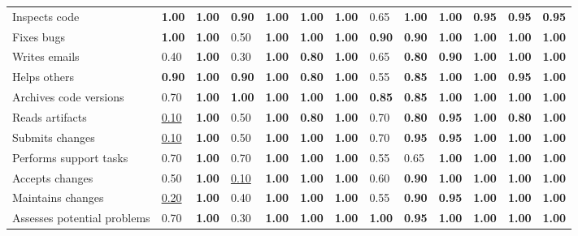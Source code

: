 \begin{tabular}{lllllllllllll}
Inspects code & \textbf{1.00} & \textbf{1.00} & \textbf{0.90} & \textbf{1.00} & \textbf{1.00} & \textbf{1.00} & 0.65 & \textbf{1.00} & \textbf{1.00} & \textbf{0.95} & \textbf{0.95} & \textbf{0.95} \\
Fixes bugs & \textbf{1.00} & \textbf{1.00} & 0.50 & \textbf{1.00} & \textbf{1.00} & \textbf{1.00} & \textbf{0.90} & \textbf{0.90} & \textbf{1.00} & \textbf{1.00} & \textbf{1.00} & \textbf{1.00} \\
Writes emails & 0.40 & \textbf{1.00} & 0.30 & \textbf{1.00} & \textbf{0.80} & \textbf{1.00} & 0.65 & \textbf{0.80} & \textbf{0.90} & \textbf{1.00} & \textbf{1.00} & \textbf{1.00} \\
Helps others & \textbf{0.90} & \textbf{1.00} & \textbf{0.90} & \textbf{1.00} & \textbf{0.80} & \textbf{1.00} & 0.55 & \textbf{0.85} & \textbf{1.00} & \textbf{1.00} & \textbf{0.95} & \textbf{1.00} \\
Archives code versions & 0.70 & \textbf{1.00} & \textbf{1.00} & \textbf{1.00} & \textbf{1.00} & \textbf{1.00} & \textbf{0.85} & \textbf{0.85} & \textbf{1.00} & \textbf{1.00} & \textbf{1.00} & \textbf{1.00} \\
Reads artifacts & \underline{0.10} & \textbf{1.00} & 0.50 & \textbf{1.00} & \textbf{0.80} & \textbf{1.00} & 0.70 & \textbf{0.80} & \textbf{0.95} & \textbf{1.00} & \textbf{0.80} & \textbf{1.00} \\
Submits changes & \underline{0.10} & \textbf{1.00} & 0.50 & \textbf{1.00} & \textbf{1.00} & \textbf{1.00} & 0.70 & \textbf{0.95} & \textbf{0.95} & \textbf{1.00} & \textbf{1.00} & \textbf{1.00} \\
Performs support tasks & 0.70 & \textbf{1.00} & 0.70 & \textbf{1.00} & \textbf{1.00} & \textbf{1.00} & 0.55 & 0.65 & \textbf{1.00} & \textbf{1.00} & \textbf{1.00} & \textbf{1.00} \\
Accepts changes & 0.50 & \textbf{1.00} & \underline{0.10} & \textbf{1.00} & \textbf{1.00} & \textbf{1.00} & 0.60 & \textbf{0.90} & \textbf{1.00} & \textbf{1.00} & \textbf{1.00} & \textbf{1.00} \\
Maintains changes & \underline{0.20} & \textbf{1.00} & 0.40 & \textbf{1.00} & \textbf{1.00} & \textbf{1.00} & 0.55 & \textbf{0.90} & \textbf{0.95} & \textbf{1.00} & \textbf{1.00} & \textbf{1.00} \\
Assesses potential problems & 0.70 & \textbf{1.00} & 0.30 & \textbf{1.00} & \textbf{1.00} & \textbf{1.00} & \textbf{1.00} & \textbf{0.95} & \textbf{1.00} & \textbf{1.00} & \textbf{1.00} & \textbf{1.00} \\

\end{tabular}

